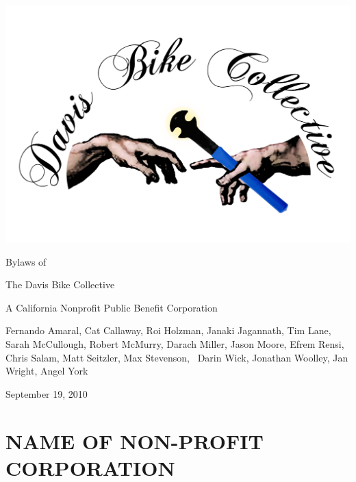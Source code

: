 \documentclass[letterpaper,titlepage]{article}
\begin{document}

\setcounter{page}{1}

\begin{titlepage}
	\begin{center}
        \includegraphics[width=\columnwidth]{logo.png}
		\vspace*{0.5in}
        \begin{LARGE}
            Bylaws of
        \end{LARGE}
		\vskip 0.25in
		\begin{Huge}
            The Davis Bike Collective
		\end{Huge}
		\vskip 0.25in
        \begin{LARGE}
            A California Nonprofit Public Benefit Corporation
        \end{LARGE}
		\vskip 0.5in
		\begin{large}
            Fernando Amaral, Cat Callaway, Roi Holzman, Janaki Jagannath, Tim
            Lane, Sarah McCullough, Robert McMurry, Darach Miller, Jason Moore,
            Efrem Rensi, Chris Salam, Matt Seitzler, Max Stevenson,  Darin
            Wick, Jonathan Woolley, Jan Wright, Angel York
        \end{large}
        \vskip 0.25in
        \begin{LARGE}
            September 19, 2010
		\end{LARGE}
	\end{center}
	\vfill
\end{titlepage}

\tableofcontents
\newpage
\listofdefn
\newpage
{}
\setcounter{page}{1}
\section{NAME OF NON-PROFIT CORPORATION}
\label{sec:name}
\end{document}
